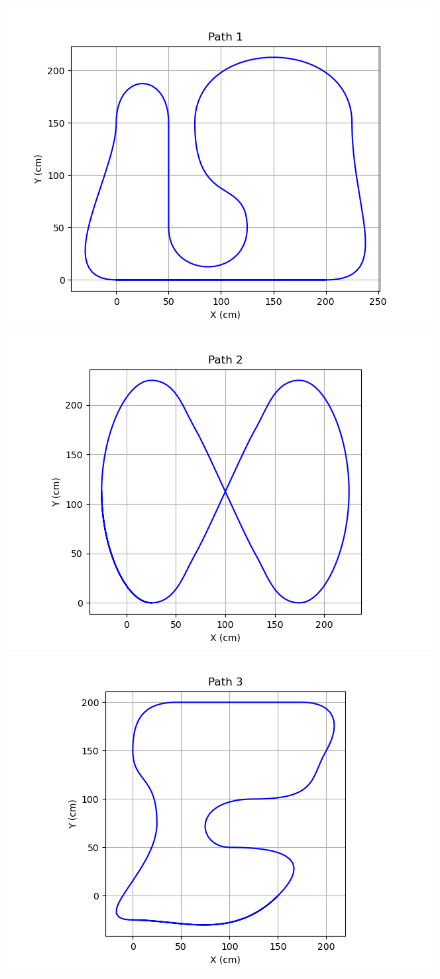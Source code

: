 \documentclass[mla7]{mla}
\begin{document}
\begin{paper}
\begin{figure}[H]
\includegraphics[width=\linewidth]{pathData/path1}
\label{img:path1}
\endminipage\hfill
{}
\includegraphics[width=\linewidth]{pathData/path2}
\label{img:path2}
\endminipage\\
\includegraphics[width=\linewidth]{pathData/path3}
\label{img:path3}
\endminipage
\end{figure}


\end{paper}
\end{document}
